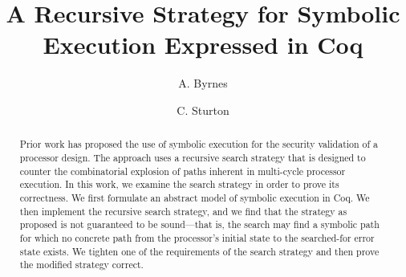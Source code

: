 \documentclass[runningheads]{llncs}
\begin{document}
\title{A Recursive Strategy for Symbolic Execution Expressed in Coq}
\author{A. Byrnes \and
C. Sturton }



\maketitle

\begin{abstract}
Prior work has proposed the use of symbolic execution for the security
validation of a processor design. The approach uses a recursive search strategy
that is designed to counter the combinatorial explosion of paths inherent in multi-cycle
processor execution. In this work, we examine the search strategy in order to
prove its correctness. We first formulate an abstract model of symbolic
execution in Coq. We then implement the recursive search strategy, and we find that the
strategy as proposed is not guaranteed to be sound---that is, the
search may find a symbolic path for which no concrete path from the processor's initial state
to the searched-for error state exists. We tighten one of the requirements of the
search strategy and then prove the modified strategy correct. 
\end{abstract}






%




%




\end{document}
